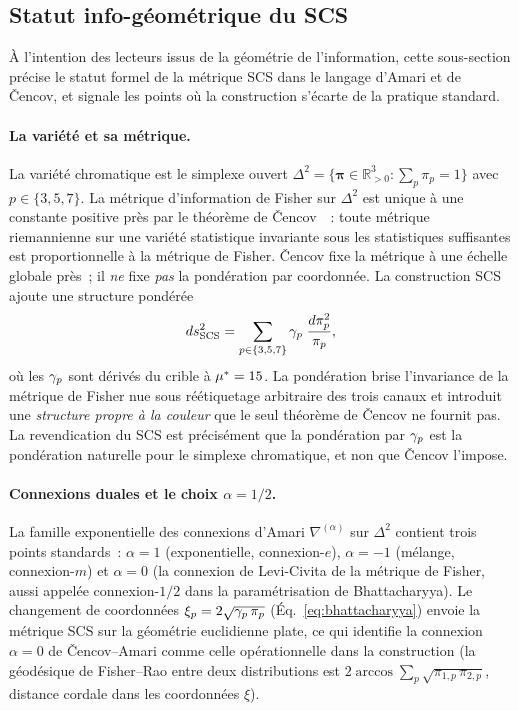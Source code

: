 \documentclass[12pt,a4paper]{article}
\begin{document}
\subsection{Statut info-g\'eom\'etrique du SCS}
\label{sec:infogeo}

\`A l'intention des lecteurs issus de la g\'eom\'etrie de
l'information, cette sous-section pr\'ecise le statut formel de la
m\'etrique SCS dans le langage d'Amari et de \v{C}encov, et signale
les points o\`u la construction s'\'ecarte de la pratique standard.

\paragraph{La vari\'et\'e et sa m\'etrique.}
La vari\'et\'e chromatique est le simplexe ouvert
$\Delta^2 = \{\bm{\pi} \in \mathbb{R}^3_{>0} : \sum_p \pi_p = 1\}$
avec $p \in \{3, 5, 7\}$. La m\'etrique d'information de Fisher sur
$\Delta^2$ est unique \`a une constante positive pr\`es par le
th\'eor\`eme de \v{C}encov~\cite{cencov1982}~: toute m\'etrique
riemannienne sur une vari\'et\'e statistique invariante sous les
statistiques suffisantes est proportionnelle \`a la m\'etrique de
Fisher. \v{C}encov fixe la m\'etrique \`a une \'echelle globale pr\`es~;
il \emph{ne} fixe \emph{pas} la pond\'eration par coordonn\'ee. La
construction SCS ajoute une structure pond\'er\'ee
\begin{equation}
  ds^2_{\mathrm{SCS}}
  = \sum_{p \in \{3,5,7\}} \gamma_{p}\;\frac{d\pi_p^2}{\pi_p},
  \label{eq:scs_metric}
\end{equation}
o\`u les $\gamma_{p}$ sont d\'eriv\'es du crible \`a ${\mu^{*}} = 15$. La
pond\'eration brise l'invariance de la m\'etrique de Fisher nue sous
r\'e\'etiquetage arbitraire des trois canaux et introduit une
\emph{structure propre \`a la couleur} que le seul th\'eor\`eme de
\v{C}encov ne fournit pas. La revendication du SCS est pr\'ecis\'ement
que la pond\'eration par $\gamma_{p}$ est la pond\'eration naturelle
pour le simplexe chromatique, et non que \v{C}encov l'impose.

\paragraph{Connexions duales et le choix $\alpha = 1/2$.}
La famille exponentielle des connexions d'Amari $\nabla^{(\alpha)}$
sur $\Delta^2$ contient trois points standards~: $\alpha = 1$
(exponentielle, connexion-$e$), $\alpha = -1$ (m\'elange,
connexion-$m$) et $\alpha = 0$ (la connexion de Levi-Civita de la
m\'etrique de Fisher, aussi appel\'ee connexion-$1/2$ dans la
param\'etrisation de Bhattacharyya). Le changement de coordonn\'ees
$\xi_p = 2\sqrt{\gamma_{p}\,\pi_p}$ (\'Eq.~\eqref{eq:bhattacharyya})
envoie la m\'etrique SCS sur la g\'eom\'etrie euclidienne plate, ce
qui identifie la connexion $\alpha = 0$ de \v{C}encov--Amari comme
celle op\'erationnelle dans la construction (la g\'eod\'esique de
Fisher--Rao entre deux distributions est
$2 \arccos \sum_p \sqrt{\pi_{1,p}\,\pi_{2,p}}$, distance cordale dans
les coordonn\'ees $\xi$).
\end{document}
